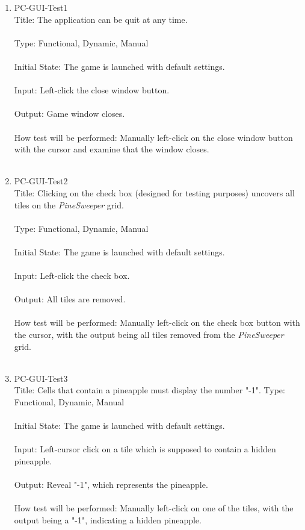 \documentclass[12pt, titlepage]{article}
\begin{document}
\begin{enumerate}

\item{PC-GUI-Test1\\}
Title: The application can be quit at any time.\\\\
Type: Functional, Dynamic, Manual\\\\
Initial State: The game is launched with default settings.\\\\
Input: Left-click the close window button.\\\\
Output: Game window closes.\\\\
How test will be performed: Manually left-click on the close window button with the cursor and examine that the window closes.\\\\

\item{PC-GUI-Test2\\}
Title: Clicking on the check box (designed for testing purposes) uncovers all tiles on the \textit{PineSweeper} grid.\\\\
Type: Functional, Dynamic, Manual\\\\
Initial State: The game is launched with default settings.\\\\
Input: Left-click the check box.\\\\
Output: All tiles are removed.\\\\
How test will be performed: Manually left-click on the check box button with the cursor, with the output being all tiles removed from the \textit{PineSweeper} grid.\\\\

\newpage
\item{PC-GUI-Test3\\}
Title: Cells that contain a pineapple must display the number "-1".
Type: Functional, Dynamic, Manual\\\\
Initial State: The game is launched with default settings.\\\\
Input: Left-cursor click on a tile which is supposed to contain a hidden pineapple.\\\\
Output: Reveal "-1", which represents the pineapple.\\\\
How test will be performed: Manually left-click on one of the tiles, with the output being a "-1", indicating a hidden pineapple.\\\\

\end{enumerate}
\end{document}
